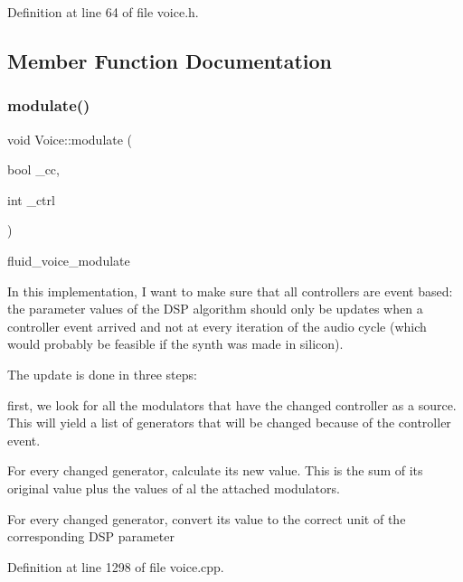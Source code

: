 Definition at line 64 of file voice.\+h.



\subsection{Member Function Documentation}
\mbox{\label{class_fluid_s_1_1_voice_a474d2173990e1d7996168688a6c111c2}} 
\subsubsection{\texorpdfstring{modulate()}{modulate()}}
{\footnotesize\ttfamily void Voice\+::modulate (\begin{DoxyParamCaption}\item[{bool}]{\+\_\+cc,  }\item[{int}]{\+\_\+ctrl }\end{DoxyParamCaption})}

fluid\+\_\+voice\+\_\+modulate

In this implementation, I want to make sure that all controllers are event based\+: the parameter values of the D\+SP algorithm should only be updates when a controller event arrived and not at every iteration of the audio cycle (which would probably be feasible if the synth was made in silicon).

The update is done in three steps\+:


\begin{DoxyItemize}
\item first, we look for all the modulators that have the changed controller as a source. This will yield a list of generators that will be changed because of the controller event.
\item For every changed generator, calculate its new value. This is the sum of its original value plus the values of al the attached modulators.
\item For every changed generator, convert its value to the correct unit of the corresponding D\+SP parameter 
\end{DoxyItemize}

Definition at line 1298 of file voice.\+cpp.

\mbox{\label{class_fluid_s_1_1_voice_ae50c72121f4700b97c407ef260efb94b}} 
